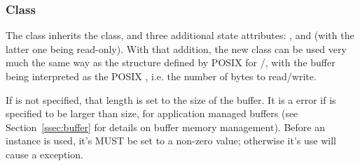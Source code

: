  
 
  \subsubsection*{Class }
 
    The  class inherits the 
    class, and three additional state attributes: ,
     and  (with the latter one being
    read-only).  With that addition, the new class can be used
    very much the same way as the  structure defined by
    POSIX for /, with the buffer 
    being interpreted as the POSIX , i.e. the
    number of bytes to read/write.
 
    If  is not specified, that length is set
    to the size of the buffer.  It is a  error
    if  is specified to be larger than size, for
    application managed buffers (see Section~\ref{ssec:buffer}
    for details on buffer memory management).  Before an
     instance is used, it's  MUST be set to
    a non-zero value; otherwise it's use will cause a
     exception.
 
